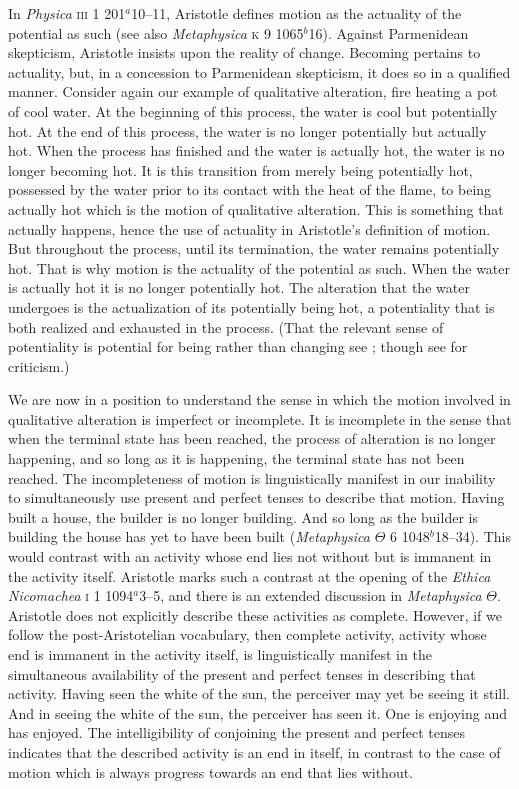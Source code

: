 In \emph{Physica} \textsc{iii} 1 201\( ^{a} \)10--11, Aristotle defines motion as the actuality of the potential as such (see also \emph{Metaphysica} \textsc{k} 9 1065\( ^{b} \)16). Against Parmenidean skepticism, Aristotle insists upon the reality of change. Becoming pertains to actuality, but, in a concession to Parmenidean skepticism, it does so in a qualified manner. Consider again our example of qualitative alteration, fire heating a pot of cool water. At the beginning of this process, the water is cool but potentially hot. At the end of this process, the water is no longer potentially but actually hot. When the process has finished and the water is actually hot, the water is no longer becoming hot. It is this transition from merely being potentially hot, possessed by the water prior to its contact with the heat of the flame, to being actually hot which is the motion of qualitative alteration. This is something that actually happens, hence the use of actuality in Aristotle's definition of motion. But throughout the process, until its termination, the water remains potentially hot. That is why motion is the actuality of the potential as such. When the water is actually hot it is no longer potentially hot. The alteration that the water undergoes is the actualization of its potentially being hot, a potentiality that is both realized and exhausted in the process. (That the relevant sense of potentiality is potential for being rather than changing see \citealt{Kosman:1969aa}; though see \citealt{Heinaman:1994aa} for criticism.)

We are now in a position to understand the sense in which the motion involved in qualitative alteration is imperfect or incomplete. It is incomplete in the sense that when the terminal state has been reached, the process of alteration is no longer happening, and so long as it is happening, the terminal state has not been reached. The incompleteness of motion is linguistically manifest in our inability to simultaneously use present and perfect tenses to describe that motion. Having built a house, the builder is no longer building. And so long as the builder is building the house has yet to have been built (\emph{Metaphysica} \( \Theta \) 6 1048\( ^{b} \)18--34). This would contrast with an activity whose end lies not without but is immanent in the activity itself. Aristotle marks such a contrast at the opening of the \emph{Ethica Nicomachea} \textsc{i} 1 1094\( ^{a} \)3--5, and there is an extended discussion in \emph{Metaphysica} \( \Theta \). Aristotle does not explicitly describe these activities as complete. However, if we follow the post-Aristotelian vocabulary, then complete activity, activity whose end is immanent in the activity itself, is linguistically manifest in the simultaneous availability of the present and perfect tenses in describing that activity. Having seen the white of the sun, the perceiver may yet be seeing it still. And in seeing the white of the sun, the perceiver has seen it. One is enjoying and has enjoyed. The intelligibility of conjoining the present and perfect tenses indicates that the described activity is an end in itself, in contrast to the case of motion which is always progress towards an end that lies without.

